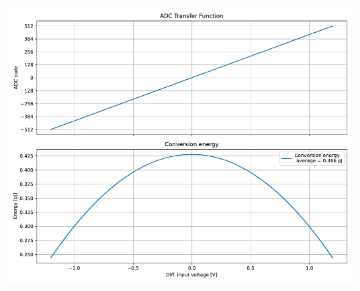 \documentclass[varwidth]{standalone}
\begin{document}
\begin{figure}
\begin{subfigure}{0.32\textwidth}
    \includegraphics[width=\textwidth]{behavioral_10b_ideal_energy.pdf}
\end{subfigure}
\end{figure}
\end{document}
